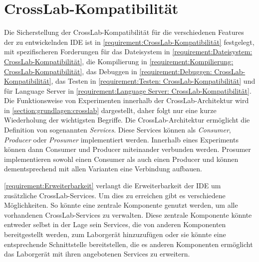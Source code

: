 \section{CrossLab-Kompatibilität}\label{section:konzeption:crosslab-kompatibilität}

Die Sicherstellung der CrossLab-Kompatibilität für die verschiedenen Features der zu entwickelnden IDE ist in \autoref{requirement:CrossLab-Kompatibilität} festgelegt, mit spezifischeren Forderungen für das Dateisystem in \autoref{requirement:Dateisystem: CrossLab-Kompatibilität}, die Kompilierung in \autoref{requirement:Kompilierung: CrossLab-Kompatibilität}, das Debuggen in \autoref{requirement:Debuggen: CrossLab-Kompatibilität}, das Testen in \autoref{requirement:Testen: CrossLab-Kompatibilität} und für Language Server in \autoref{requirement:Language Server: CrossLab-Kompatibilität}. Die Funktionsweise von Experimenten innerhalb der CrossLab-Architektur wird in \autoref{section:grundlagen:crosslab} dargestellt, daher folgt nur eine kurze Wiederholung der wichtigsten Begriffe. Die CrossLab-Architektur ermöglicht die Definition von sogenannten \emph{Services}. Diese Services können als \emph{Consumer}, \emph{Producer} oder \emph{Prosumer} implementiert werden. Innerhalb eines Experiments können dann Consumer und Producer miteinander verbunden werden. Prosumer implementieren sowohl einen Consumer als auch einen Producer und können dementsprechend mit allen Varianten eine Verbindung aufbauen.

\autoref{requirement:Erweiterbarkeit} verlangt die Erweiterbarkeit der IDE um zusätzliche CrossLab-Services. Um dies zu erreichen gibt es verschiedene Möglichkeiten. So könnte eine zentrale Komponente genutzt werden, um alle vorhandenen CrossLab-Services zu verwalten. Diese zentrale Komponente könnte entweder selbst in der Lage sein Services, die von anderen Komponenten bereitgestellt werden, zum Laborgerät hinzuzufügen oder sie könnte eine entsprechende Schnittstelle bereitstellen, die es anderen Komponenten ermöglicht das Laborgerät mit ihren angebotenen Services zu erweitern.